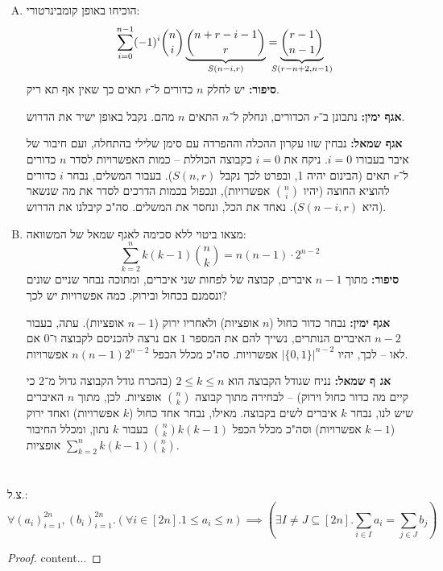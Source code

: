 \documentclass[]{article}
\newcommand\bink      {\binom{n}{k}}
\begin{document}
	\section{}
	\begin{enumerate}[(A)]
		\item הוכיחו באופן קומבינרטורי: 
		\[ \sum_{i = 0}^{n - 1}(-1)^{i} \binom{n}{i} \underbrace{\binom{n + r - i - 1}{r}}_{S(n - i, r)} = \underbrace{\binom{r - 1}{n - 1}}_{\mathclap{S(r - n + 2, n - 1)}} \]
		\textbf{סיפור: }יש לחלק $n$ כדורים ל־$r$ תאים כך שאין אף תא ריק. 
		
		\textbf{אגף ימין: }נתבונן ב־$r$ הכדורים, ונחלק ל־$n$ התאים $n$ מהם. נקבל באופן ישיר את הדרוש. 
				
		\textbf{אגף שמאל: }נבחין שזו עקרון ההכלה וההפרדה עם סימן שלילי בהתחלה, ועם חיבור של איבר בעבורו $i = 0$. ניקח את $i = 0$ כקבוצה הכוללת – כמות האפשרויות לסדר $n$ כדורים ל־$r$ תאים (הבינום יהיה 1, ובפרט לכך נקבל $S(n, r)$). בעבור המשלים, נבחר $i$ כדורים להוציא החוצה (יהיו $\binom{n}{i}$ אפשרויות), ונכפול בכמות הדרכים לסדר את מה שנשאר (היא $S(n - i, r)$). נאחד את הכל, ונחסר את המשלים. סה"כ קיבלנו את הדרוש. 
		
		\item מצאו ביטוי ללא סכימה לאגף שמאל של המשוואה: 
		\[ \sum_{k = 2}^{n} k(k - 1)\bink = n(n - 1) \cdot 2^{n - 2} \]
		\textbf{סיפור: }מתוך $n - 1$ איברים, קבוצה של לפחות שני איברים, ומתוכה נבחר שניים שונים ונסמנם בכחול ובירוק. כמה אפשרויות יש לכך? 
		
		\textbf{אגף ימין: }נבחר כדור כחול ($n$ אופציות) ולאחריו ירוק ($n - 1$ אופציות). עתה, בעבור $n - 2$ האיברים הנותרים, נשייך להם את המספר $1$ אם נרצה להכניסם לקבוצה ו־$0$ אם לאו – לכך, יהיו $|\{0, 1\}|^{n - 2}$ אפשרויות. סה"כ מכלל הכפל $n(n - 1)2^{n - 2}$ אפשרויות. 
		
		\textbf{אג ף שמאל: }נניח שגודל הקבוצה הוא $2 \le k \le n$ (בהכרח גודל הקבוצה גדול מ־2 כי קיים מה כדור כחול וירוק) – לבחירה מתוך קבוצה $\bink$ אופציות. לכן, מתוך $n$ האיברים שיש לנו, נבחר $k$ איברים לשים בקבוצה. מאילו, נבחר אחד כחול ($k$ אפשרויות) ואחד ירוק ($k - 1$ אפשרויות) וסה"כ מכלל הכפל $\binom{n}{k}k(k - 1)$ בעבור $k$ נתון, ומכלל החיבור $\sum_{k = 2}^{n}k(k - 1)\bink$ אופציות. 
		
	\end{enumerate}
	\section{}
	צ.ל.: 
	\[ \textstyle \forall (a_i)_{i = 1}^{2n}, (b_i)_{i = 1}^{2n}. (\forall i \in [2n]. 1 \le a_i \le n) \implies (\exists I \neq J \subseteq [2n]. \sum_{i \in I} a_i = \sum_{j \in J}b_j) \]
	\begin{proof}
		content...
	\end{proof}
	
\end{document}
